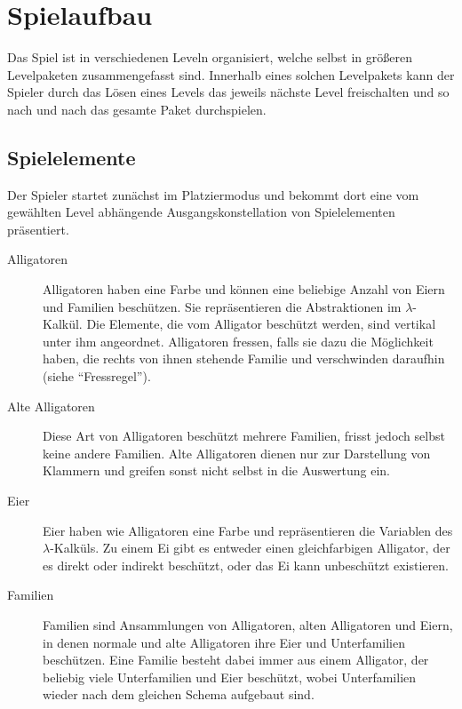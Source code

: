 \section{Spielaufbau}

Das Spiel ist in verschiedenen Leveln organisiert, welche selbst in größeren Levelpaketen zusammengefasst sind.
Innerhalb eines solchen Levelpakets kann der Spieler durch das Lösen eines Levels das jeweils nächste Level freischalten und so nach und nach das gesamte Paket durchspielen.

\subsection{Spielelemente}
Der Spieler startet zunächst im Platziermodus und bekommt dort eine vom gewählten Level abhängende Ausgangskonstellation von Spielelementen präsentiert.

	\begin{description}
		\item[Alligatoren] Alligatoren haben eine Farbe und können eine beliebige Anzahl von Eiern und Familien beschützen.
		Sie repräsentieren die Abstraktionen im \(\lambda\)-Kalkül.
		Die Elemente, die vom Alligator beschützt werden, sind vertikal unter ihm angeordnet.
		Alligatoren fressen, falls sie dazu die Möglichkeit haben, die rechts von ihnen stehende Familie und verschwinden daraufhin (siehe "`Fressregel"').

		\item[Alte Alligatoren] Diese Art von Alligatoren beschützt mehrere Familien, frisst jedoch selbst keine andere Familien.
		Alte Alligatoren dienen nur zur Darstellung von Klammern und greifen sonst nicht selbst in die Auswertung ein.

		\item[Eier] Eier haben wie Alligatoren eine Farbe und repräsentieren die Variablen des \(\lambda\)-Kalküls.
		Zu einem Ei gibt es entweder einen gleichfarbigen Alligator, der es direkt oder indirekt beschützt, oder das Ei kann unbeschützt existieren.

		\item[Familien] Familien sind Ansammlungen von Alligatoren, alten Alligatoren und Eiern, in denen normale und alte Alligatoren ihre Eier und Unterfamilien beschützen.
		Eine Familie besteht dabei immer aus einem Alligator, der beliebig viele Unterfamilien und Eier beschützt, wobei Unterfamilien wieder nach dem gleichen Schema aufgebaut sind.

	\end{description}


